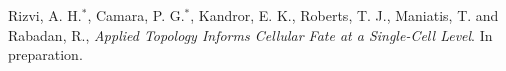 \documentclass[letterpaper,10pt,english]{/usr/share/sphinx/texinputs/sphinxhowto}
\begin{document}
        

        \renewcommand{\indexname}{Index}
        \printindex

    \begin{thebibliography}{99}
     Rizvi, A. H.${}^*$, Camara, P. G.${}^*$, Kandror, E. K., Roberts, T. J., Maniatis, T. and Rabadan, R., \emph{Applied Topology Informs Cellular Fate at a Single-Cell Level}. In preparation.
    \end{thebibliography}
    
\end{document}
